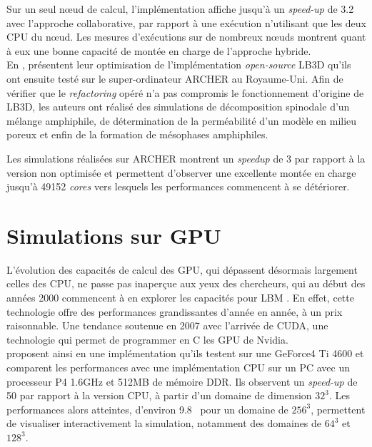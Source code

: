 Sur un seul nœud de calcul, l'implémentation affiche jusqu'à un \textit{speed-up} de 3.2 avec l'approche collaborative, par rapport à une exécution n'utilisant que les deux \acs{CPU} du nœud. Les mesures d'exécutions sur de nombreux nœuds montrent quant à eux une bonne capacité de montée en charge de l'approche hybride.\\

En \citeyear{schmieschek_lb3d_2017}, \citet{schmieschek_lb3d_2017} présentent leur optimisation de l'implémentation \textit{open-source} LB3D qu'ils ont ensuite testé sur le super-ordinateur ARCHER au Royaume-Uni. 
Afin de vérifier que le \textit{refactoring} opéré n'a pas compromis le fonctionnement d'origine de LB3D, les auteurs ont réalisé des simulations de décomposition spinodale d'un mélange amphiphile, de détermination de la perméabilité d'un modèle en milieu poreux et enfin de la formation de mésophases amphiphiles. 

Les simulations réalisées sur ARCHER montrent un \textit{speedup} de 3 par rapport à la version non optimisée et permettent d'observer une excellente montée en charge jusqu'à 49152 \textit{cores} vers lesquels les performances commencent à se détériorer.

\section{Simulations sur \acs{GPU}}
L'évolution des capacités de calcul des \acs{GPU}, qui dépassent désormais largement celles des \acs{CPU}, ne passe pas inaperçue aux yeux des chercheurs, qui au début des années 2000 commencent à en explorer les capacités pour \acs{LBM} \cite{bolz_sparse_2003, buck_brook_2004, kruger_linear_2003}. En effet, cette technologie offre des performances grandissantes d'année en année, à un prix raisonnable. Une tendance soutenue en 2007 avec l'arrivée de CUDA, une technologie qui permet de programmer en C les \acs{GPU} de Nvidia.\\

\citet{li_implementing_2003} proposent ainsi en \citeyear{li_implementing_2003} une implémentation qu'ils testent sur une GeForce4 Ti 4600 et comparent les performances avec une implémentation \acs{CPU} sur un PC avec un processeur P4 1.6GHz et 512MB de mémoire DDR. 
Ils observent un \textit{speed-up} de 50 par rapport à la version \acs{CPU}, à partir d'un domaine de dimension $32^3$. Les performances alors atteintes, d'environ 9.8~  pour un domaine de $256^3$, permettent de visualiser interactivement la simulation, notamment des domaines de $64^3$ et $128^3$.\\

